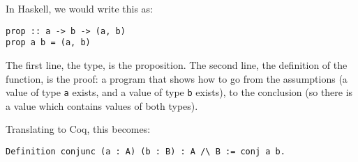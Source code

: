 In Haskell, we would write this as:

\begin{verbatim}
prop :: a -> b -> (a, b)
prop a b = (a, b)
\end{verbatim}

The first line, the type, is the proposition.
The second line, the definition of the function, is the proof: a program that shows how to go from the assumptions (a value of type \texttt{a} exists, and a value of type \texttt{b} exists), to the conclusion (so there is a value which contains values of both types).

Translating to Coq, this becomes:

\begin{verbatim}
Definition conjunc (a : A) (b : B) : A /\ B := conj a b.
\end{verbatim}

